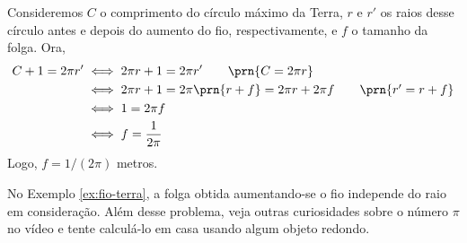 \begin{solution}
Consideremos $C$ o comprimento do círculo máximo da Terra, $r$ e $r'$ os raios desse círculo antes e depois do aumento do fio, respectivamente, e $f$ o tamanho da folga. Ora,
%
\begin{align*}
C+1=2\pi r' & \iff 2\pi r+1=2\pi r' \tag*{$\prn{C = 2\pi r}$}\\
	& \iff 2\pi r+1= 2\pi \prn{r+f} = 2\pi r+2\pi f \tag*{$\prn{r' = r+f}$}\\
	& \iff 1 = 2\pi f\\
	& \iff f = \dfrac{1}{2\pi}
\end{align*}
%
Logo, $f = 1/(2\pi)$ metros.
\end{solution}

\noindent No Exemplo \ref{ex:fio-terra}, a folga obtida aumentando-se o fio independe do raio em consideração. Além desse problema, veja outras curiosidades sobre o número $\pi$ no vídeo  e tente calculá-lo em casa usando algum objeto redondo.	